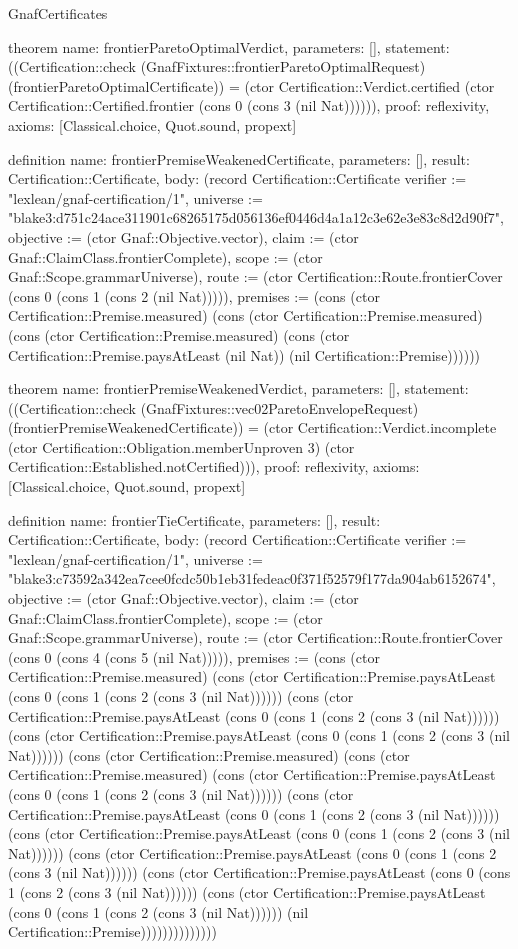 \begin{lexlean}{GnafCertificates}
\begin{semanticmodule}
theorem{
  name: frontierParetoOptimalVerdict,
  parameters: [],
  statement: ((Certification::check (GnafFixtures::frontierParetoOptimalRequest) (frontierParetoOptimalCertificate)) = (ctor Certification::Verdict.certified (ctor Certification::Certified.frontier (cons 0 (cons 3 (nil Nat)))))),
  proof: reflexivity{},
  axioms: [Classical.choice, Quot.sound, propext]
}

definition{
  name: frontierPremiseWeakenedCertificate,
  parameters: [],
  result: Certification::Certificate,
  body: (record Certification::Certificate {verifier := "lexlean/gnaf-certification/1", universe := "blake3:d751c24ace311901c68265175d056136ef0446d4a1a12c3e62e3e83c8d2d90f7", objective := (ctor Gnaf::Objective.vector), claim := (ctor Gnaf::ClaimClass.frontierComplete), scope := (ctor Gnaf::Scope.grammarUniverse), route := (ctor Certification::Route.frontierCover (cons 0 (cons 1 (cons 2 (nil Nat))))), premises := (cons (ctor Certification::Premise.measured) (cons (ctor Certification::Premise.measured) (cons (ctor Certification::Premise.measured) (cons (ctor Certification::Premise.paysAtLeast (nil Nat)) (nil Certification::Premise)))))})
}

theorem{
  name: frontierPremiseWeakenedVerdict,
  parameters: [],
  statement: ((Certification::check (GnafFixtures::vec02ParetoEnvelopeRequest) (frontierPremiseWeakenedCertificate)) = (ctor Certification::Verdict.incomplete (ctor Certification::Obligation.memberUnproven 3) (ctor Certification::Established.notCertified))),
  proof: reflexivity{},
  axioms: [Classical.choice, Quot.sound, propext]
}

definition{
  name: frontierTieCertificate,
  parameters: [],
  result: Certification::Certificate,
  body: (record Certification::Certificate {verifier := "lexlean/gnaf-certification/1", universe := "blake3:c73592a342ea7cee0fcdc50b1eb31fedeac0f371f52579f177da904ab6152674", objective := (ctor Gnaf::Objective.vector), claim := (ctor Gnaf::ClaimClass.frontierComplete), scope := (ctor Gnaf::Scope.grammarUniverse), route := (ctor Certification::Route.frontierCover (cons 0 (cons 4 (cons 5 (nil Nat))))), premises := (cons (ctor Certification::Premise.measured) (cons (ctor Certification::Premise.paysAtLeast (cons 0 (cons 1 (cons 2 (cons 3 (nil Nat)))))) (cons (ctor Certification::Premise.paysAtLeast (cons 0 (cons 1 (cons 2 (cons 3 (nil Nat)))))) (cons (ctor Certification::Premise.paysAtLeast (cons 0 (cons 1 (cons 2 (cons 3 (nil Nat)))))) (cons (ctor Certification::Premise.measured) (cons (ctor Certification::Premise.measured) (cons (ctor Certification::Premise.paysAtLeast (cons 0 (cons 1 (cons 2 (cons 3 (nil Nat)))))) (cons (ctor Certification::Premise.paysAtLeast (cons 0 (cons 1 (cons 2 (cons 3 (nil Nat)))))) (cons (ctor Certification::Premise.paysAtLeast (cons 0 (cons 1 (cons 2 (cons 3 (nil Nat)))))) (cons (ctor Certification::Premise.paysAtLeast (cons 0 (cons 1 (cons 2 (cons 3 (nil Nat)))))) (cons (ctor Certification::Premise.paysAtLeast (cons 0 (cons 1 (cons 2 (cons 3 (nil Nat)))))) (cons (ctor Certification::Premise.paysAtLeast (cons 0 (cons 1 (cons 2 (cons 3 (nil Nat)))))) (nil Certification::Premise)))))))))))))})
}


\end{semanticmodule}
\end{lexlean}
